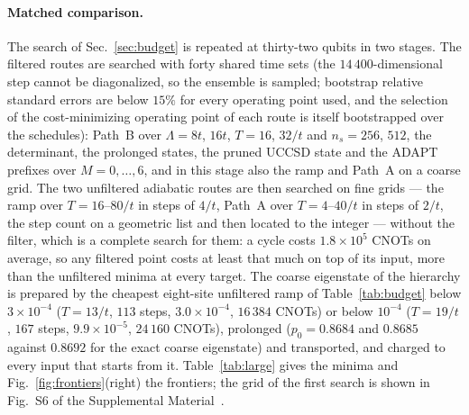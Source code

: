\documentclass[a4paper,11pt,noarxiv]{quantumarticle}
\newcommand{\SM}{Supplemental Material~\cite{SM}}
\begin{document}
\paragraph{Matched comparison.}
The search of Sec.~\ref{sec:budget} is repeated at thirty-two qubits in
two stages.  The filtered routes are searched with forty shared time
sets (the $14\,400$-dimensional step cannot be diagonalized, so the
ensemble is sampled; bootstrap relative standard errors are below $15\%$
for every operating point used, and the selection of the cost-minimizing
operating point of each route is itself bootstrapped over the schedules):
Path~B over $\Lambda=8t$, $16t$, $T=16$, $32/t$ and $n_s=256$, $512$, the
determinant, the prolonged states, the pruned UCCSD state and the ADAPT
prefixes over $M=0,\ldots,6$, and in this stage also the ramp and Path~A
on a coarse grid.  The two unfiltered adiabatic routes are then searched
on fine grids --- the ramp over $T=16$--$80/t$ in steps of $4/t$, Path~A
over $T=4$--$40/t$ in steps of $2/t$, the step count on a geometric list
and then located to the integer --- without the filter, which is a
complete search for them: a cycle costs $1.8\times10^5$ CNOTs on average,
so any filtered point costs at least that much on top of its input, more
than the unfiltered minima at every target.  The coarse eigenstate of the
hierarchy is prepared by the cheapest eight-site unfiltered ramp of
Table~\ref{tab:budget} below $3\times10^{-4}$ ($T=13/t$, $113$ steps,
$3.0\times10^{-4}$, $16\,384$ CNOTs) or below $10^{-4}$ ($T=19/t$, $167$
steps, $9.9\times10^{-5}$, $24\,160$ CNOTs), prolonged ($p_0=0.8684$ and
$0.8685$ against $0.8692$ for the exact coarse eigenstate) and
transported, and charged to every input that starts from it.
Table~\ref{tab:large} gives the minima and Fig.~\ref{fig:frontiers}(right)
the frontiers; the grid of the first search is shown in Fig.~S6 of the
\SM{}.
\end{document}
